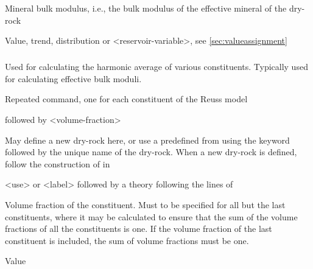 {
 \slist
   \item \Description Mineral bulk modulus, i.e., the bulk modulus of the effective mineral of the dry-rock
   \item \Argument Value, trend, distribution or <reservoir-variable>, see \autoref{sec:valueassignment}
   \item \Default
 \elist

\subparagraph{}
 \slist
   \item \Description Used for calculating the harmonic average of various constituents. Typically used for calculating effective bulk moduli.
   \item \Argument
   \item \Default
 \elist

 \slist
   \item \Description Repeated command, one for each constituent of the Reuss model
   \item {} followed by <volume-fraction>
   \item \Default
 \elist

 \slist
   \item \Description May define a new dry-rock here, or use a predefined  from  using the keyword  followed by the unique name of the dry-rock. When a new dry-rock is defined, follow the construction of  in 
   \item \Argument <use> or <label> followed by a theory following the lines of 
   \item \Default
 \elist

 \slist
   \item \Description Volume fraction of the constituent. Must to be specified for all but the last constituents, where it may be calculated to ensure that the sum of the volume fractions of all the constituents is one. If the volume fraction of the last constituent is included, the sum of volume fractions must be one.
   \item \Argument Value
   \item \Default
 \elist

}
